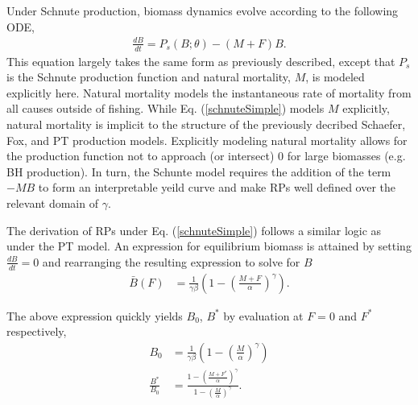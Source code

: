 %
Under Schnute production, biomass dynamics evolve according to the following ODE,
%
\begin{align}
\frac{dB}{dt} = P_s(B;\theta) - (M+F)B. \label{schnuteSimple}
\end{align}
%
This equation largely takes the same form as previously described, except
that $P_s$ is the Schnute production function and natural mortality, $M$, is modeled
explicitly here. %
Natural mortality models the instantaneous rate of mortality from all causes
outside of fishing. While Eq. (\ref{schnuteSimple}) models $M$ explicitly,
natural mortality is implicit to the structure of the previously decribed
Schaefer, Fox, and PT production models. Explicitly modeling natural mortality
allows for the production function not to approach (or intersect) 0 for large
biomasses (e.g. BH production). In turn, the Schunte model requires the addition
of the term $-MB$ to form an interpretable yeild curve and make RPs well defined
over the relevant domain of $\gamma$.



%
The derivation of RPs under Eq. (\ref{schnuteSimple}) follows a similar logic
as under the PT model. An expression for equilibrium biomass is attained by
setting $\frac{dB}{dt}=0$ and rearranging the resulting expression to solve
for $B$
%
\begin{align}
\bar{B}(F) &= \frac{1}{\gamma \beta}\left(1-\left(\frac{M+F}{\alpha}\right)^\gamma\right).
\label{BsEq}
\end{align}

%
The above expression quickly yields $B_0$, $B^*$ by evaluation at $F=0$ and $F^*$ respectively,
\begin{align}
B_0 &= \frac{1}{\gamma \beta}\left(1-\left(\frac{M}{\alpha}\right)^\gamma\right) \label{B0S}\\
\frac{B^*}{B_0} &= \frac{1-\left(\frac{M+F^*}{\alpha}\right)^\gamma}{ 1-\left(\frac{M}{\alpha}\right)^\gamma }. \label{BratS}
\end{align}


